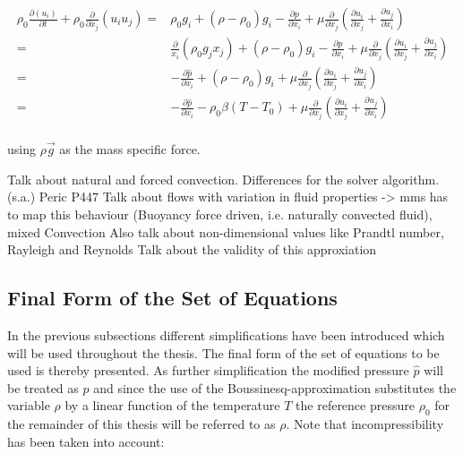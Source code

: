       \begin{align}
        \rho_0 \frac{\partial \left( u_i \right)}{\partial t} 
        + \rho_0 \frac{\partial}{\partial x_j} \left( u_i  u_j \right) 
        =& \rho_0 g_i + \left(\rho - \rho_0 \right) g_i
        - \frac{\partial p}{\partial x_i}
        +  \mu \frac{\partial}{\partial x_j} \left( \frac{\partial u_i}{\partial x_j} 
                                             + \frac{\partial u_j}{\partial x_i} \right) \nonumber \\
        =& \frac{\partial}{x_i}\left(\rho_0 g_j x_j \right) 
        + \left(\rho - \rho_0 \right) g_i
        - \frac{\partial p}{\partial x_i}
        +  \mu \frac{\partial}{\partial x_j} \left( \frac{\partial u_i}{\partial x_j} 
                                             + \frac{\partial u_j}{\partial x_i} \right) \nonumber \\
        =& - \frac{\partial \hat{p}}{\partial x_i} 
        + \left(\rho - \rho_0 \right) g_i
        +  \mu \frac{\partial}{\partial x_j} \left( \frac{\partial u_i}{\partial x_j} 
                                             + \frac{\partial u_j}{\partial x_i} \right) \nonumber \\
        =& - \frac{\partial \hat{p}}{\partial x_i} 
        - \rho_0 \beta \left( T - T_0 \right)
        +  \mu \frac{\partial}{\partial x_j} \left( \frac{\partial u_i}{\partial x_j} 
                                             + \frac{\partial u_j}{\partial x_i} \right) \nonumber \\
      \end{align}

      using \(\rho \vec{g}\) as the mass specific force. 


      Talk about natural and forced convection. Differences for the solver algorithm. (s.a.) Peric P447
      Talk about flows with variation in fluid properties -> mms has to map this behaviour (Buoyancy force driven, i.e. naturally convected fluid), mixed Convection
      Also talk about non-dimensional values like Prandtl number, Rayleigh and Reynolds
      Talk about the validity of this approxiation

    \subsection{Final Form of the Set of Equations}

    In the previous subsections different simplifications have been introduced which will be used throughout the thesis. The final form of the set of equations to be used is thereby presented. As further simplification the modified pressure \(\hat{p}\) will be treated as \(p\) and since the use of the Boussinesq-approximation substitutes the variable \(\rho\) by a linear function of the temperature \(T\) the reference pressure \(\rho_0\) for the remainder of this thesis will be referred to as \(\rho\). Note that incompressibility has been taken into account:

